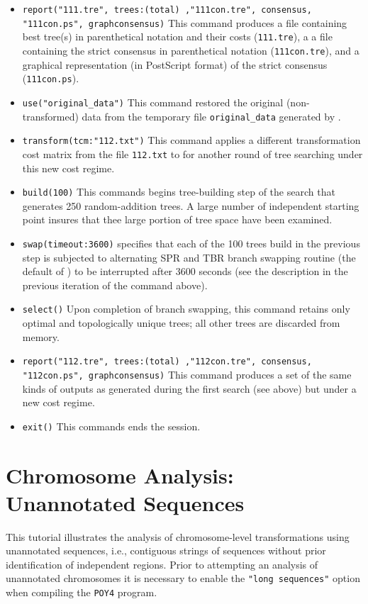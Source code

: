\begin{itemize}
\item \texttt{report("111.tre", trees:(total) ,"111con.tre", consensus, \\ "111con.ps", graphconsensus)} This command produces a file containing best tree(s) in parenthetical notation and their costs (\texttt{111.tre}), a a file containing the strict consensus in parenthetical notation (\texttt{111con.tre}), and a graphical representation (in PostScript format) of the strict consensus (\texttt{111con.ps}).
\item \texttt{use("original\_data")} This command restored the original (non-transformed) data from the temporary file \texttt{original\_data} generated by .
\item \texttt{transform(tcm:"112.txt")} This command applies a different transformation cost matrix from the file \texttt{112.txt} to for another round of tree searching under this new cost regime.
\item \texttt{build(100)} This commands begins tree-building step of the search that generates 250 random-addition trees. A large number of independent starting point insures that thee large portion of tree space have been examined.
\item \texttt{swap(timeout:3600)}  specifies that each of the 100 trees build in the previous step is subjected to alternating SPR and TBR branch swapping routine (the default of \poy) to be interrupted after 3600 seconds (see the description in the previous iteration of the command above).
\item \texttt{select()} Upon completion of branch swapping, this command retains only optimal and topologically unique trees; all other trees are discarded from memory.
\item \texttt{report("112.tre", trees:(total) ,"112con.tre", consensus, \\ "112con.ps", graphconsensus)} This command produces a set of the same kinds of outputs as generated during the first search (see above) but under a new cost regime.
\item \texttt{exit()} This commands ends the \poy session.
\end{itemize}

\section{Chromosome Analysis: Unannotated Sequences}{\label{tutorial 6}}

This tutorial illustrates the analysis of chromosome-level transformations using 
unannotated sequences, i.e., contiguous strings of sequences without prior 
identification of independent regions. Prior to attempting an analysis of  
unannotated chromosomes it is necessary to enable the \texttt {"long sequences"}
option when compiling the \texttt{POY4} program. 

